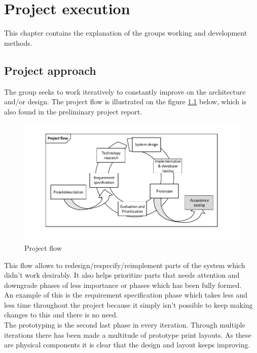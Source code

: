 \chapter{Project execution}
This chapter contains the explanation of the groups working and development methods.

\section{Project approach}
The group seeks to work iteratively to constantly improve on the architecture and/or design. The project flow is illustrated on the figure \ref{fig:projectflow} below, which is also found in the preliminary project report.
\begin{figure}[hbpt]
	\centering
	\includegraphics[width=1\textwidth]{billeder/9projectexecution/projectflow}
	\caption{Project flow}
	\label{fig:projectflow}
\end{figure}

This flow allows to redesign/respecify/reimplement parts of the system which didn't work desirably. It also helps prioritize parts that needs attention and downgrade phases of less importance or phases which has been fully formed.\\
An example of this is the requirement specification phase which takes less and less time throughout the project because it simply isn't possible to keep making changes to this and there is no need.\\
The prototyping is the second last phase in every iteration. Through multiple iterations there has been made a multitude of prototype print layouts. As these are physical components it is clear that the design and layout keeps improving.\\

